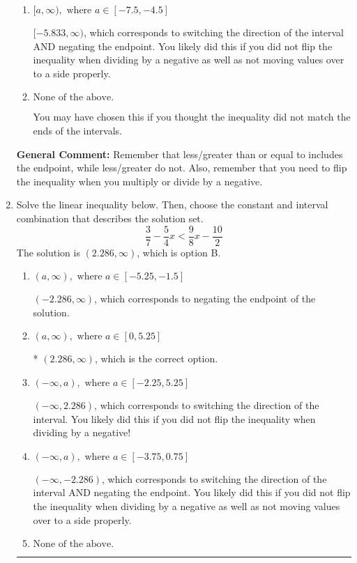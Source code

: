\documentclass{extbook}[14pt]
\newcommand{\litem}[1]{\item #1

\rule{\textwidth}{0.4pt}}
\begin{document}
\begin{enumerate}
{\begin{enumerate}[label=\Alph*.]
 $[5.833, \infty)$, which corresponds to switching the direction of the interval. You likely did this if you did not flip the inequality when dividing by a negative!
\item \( [a, \infty), \text{ where } a \in [-7.5, -4.5] \)

 $[-5.833, \infty)$, which corresponds to switching the direction of the interval AND negating the endpoint. You likely did this if you did not flip the inequality when dividing by a negative as well as not moving values over to a side properly.
\item \( \text{None of the above}. \)

You may have chosen this if you thought the inequality did not match the ends of the intervals.
\end{enumerate}

\textbf{General Comment:} Remember that less/greater than or equal to includes the endpoint, while less/greater do not. Also, remember that you need to flip the inequality when you multiply or divide by a negative.
}
\litem{
Solve the linear inequality below. Then, choose the constant and interval combination that describes the solution set.
\[ \frac{3}{7} - \frac{5}{4} x < \frac{9}{8} x - \frac{10}{2} \]The solution is \( (2.286, \infty) \), which is option B.\begin{enumerate}[label=\Alph*.]
\item \( (a, \infty), \text{ where } a \in [-5.25, -1.5] \)

 $(-2.286, \infty)$, which corresponds to negating the endpoint of the solution.
\item \( (a, \infty), \text{ where } a \in [0, 5.25] \)

* $(2.286, \infty)$, which is the correct option.
\item \( (-\infty, a), \text{ where } a \in [-2.25, 5.25] \)

 $(-\infty, 2.286)$, which corresponds to switching the direction of the interval. You likely did this if you did not flip the inequality when dividing by a negative!
\item \( (-\infty, a), \text{ where } a \in [-3.75, 0.75] \)

 $(-\infty, -2.286)$, which corresponds to switching the direction of the interval AND negating the endpoint. You likely did this if you did not flip the inequality when dividing by a negative as well as not moving values over to a side properly.
\item \( \text{None of the above}. \)


\end{enumerate}}
\end{enumerate}
\end{document}

